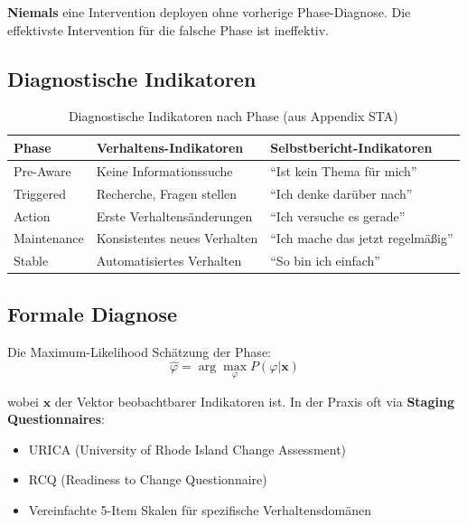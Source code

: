 \begin{tcolorbox}[colback=blue!5!white, colframe=blue!75!black,
    title=Prinzip: Diagnosis Before Intervention]
\textbf{Niemals} eine Intervention deployen ohne vorherige Phase-Diagnose. Die effektivste Intervention für die falsche Phase ist ineffektiv.
\end{tcolorbox}

\subsection{Diagnostische Indikatoren}

\begin{table}[htbp]
\centering
\caption{Diagnostische Indikatoren nach Phase (aus Appendix STA)}
\label{tab:18-diagnosis-indicators}
\renewcommand{\arraystretch}{1.4}
\small
\begin{tabular}{@{}lll@{}}
\toprule
\textbf{Phase} & \textbf{Verhaltens-Indikatoren} & \textbf{Selbstbericht-Indikatoren} \\
\midrule
Pre-Aware & Keine Informationssuche & ``Ist kein Thema für mich'' \\
Triggered & Recherche, Fragen stellen & ``Ich denke darüber nach'' \\
Action & Erste Verhaltensänderungen & ``Ich versuche es gerade'' \\
Maintenance & Konsistentes neues Verhalten & ``Ich mache das jetzt regelmäßig'' \\
Stable & Automatisiertes Verhalten & ``So bin ich einfach'' \\
\bottomrule
\end{tabular}
\end{table}

\subsection{Formale Diagnose}

Die Maximum-Likelihood Schätzung der Phase:
\begin{equation}
\hat{\varphi} = \arg\max_{\varphi} P(\varphi | \mathbf{x})
\label{eq:18-phase-mle}
\end{equation}

wobei $\mathbf{x}$ der Vektor beobachtbarer Indikatoren ist. In der Praxis oft via \textbf{Staging Questionnaires}:
\begin{itemize}
\item URICA (University of Rhode Island Change Assessment)
\item RCQ (Readiness to Change Questionnaire)
\item Vereinfachte 5-Item Skalen für spezifische Verhaltensdomänen
\end{itemize}


